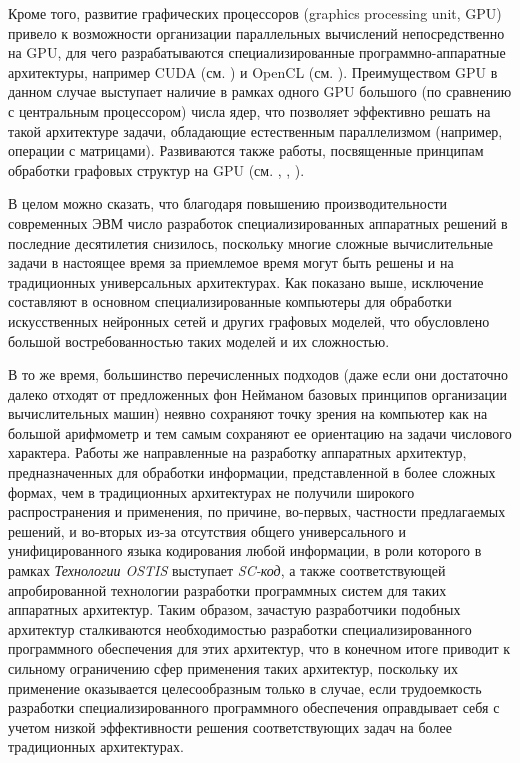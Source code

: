 Кроме того, развитие графических процессоров (graphics processing unit, GPU) привело к возможности организации параллельных вычислений непосредственно на GPU, для чего разрабатываются специализированные программно-аппаратные архитектуры, например CUDA (см. ) и OpenCL (см. ). Преимуществом GPU в данном случае выступает наличие в рамках одного GPU большого (по сравнению с центральным процессором) числа ядер, что позволяет эффективно решать на такой архитектуре задачи, обладающие естественным параллелизмом (например, операции с  матрицами). Развиваются также работы, посвященные принципам обработки графовых структур на GPU (см. , , ).

В целом можно сказать, что благодаря повышению производительности современных ЭВМ число разработок специализированных аппаратных решений в последние десятилетия снизилось, поскольку многие сложные вычислительные задачи в настоящее время за приемлемое время могут быть решены и на традиционных универсальных архитектурах. Как показано выше, исключение составляют в основном специализированные компьютеры для обработки искусственных нейронных сетей и других графовых моделей, что обусловлено большой востребованностью таких моделей и их сложностью.

В то же время, большинство перечисленных подходов (даже если они достаточно далеко отходят от предложенных фон Нейманом базовых принципов организации вычислительных машин) неявно сохраняют точку зрения на компьютер как на большой арифмометр и тем самым сохраняют ее ориентацию на задачи числового характера. Работы же направленные на разработку аппаратных архитектур, предназначенных для обработки информации, представленной в более сложных формах, чем в традиционных архитектурах не получили широкого распространения и применения, 
по причине, во-первых, частности предлагаемых решений, и во-вторых из-за отсутствия общего универсального и унифицированного языка кодирования любой информации, в роли которого в рамках \textit{Технологии OSTIS} выступает \textit{SC-код}, а также соответствующей апробированной технологии разработки программных систем для таких аппаратных архитектур. Таким образом, зачастую разработчики подобных архитектур сталкиваются необходимостью разработки специализированного программного обеспечения для этих архитектур, что в конечном итоге приводит к сильному ограничению сфер применения таких архитектур, поскольку их применение оказывается целесообразным только в случае, если трудоемкость разработки специализированного программного обеспечения оправдывает себя с учетом низкой эффективности решения соответствующих задач на более традиционных архитектурах.

